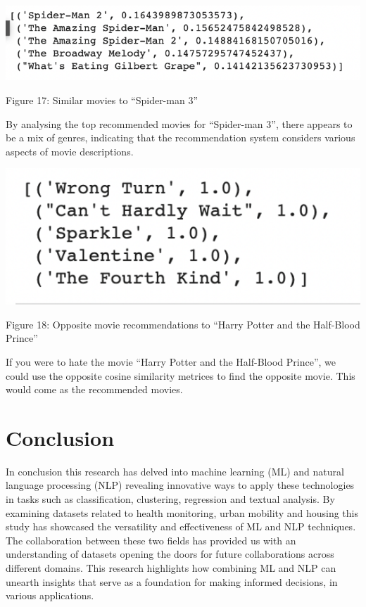 \documentclass{article}
\begin{document}
\begin{multicols}{2}
\includegraphics[scale=.5]{img/nlp5.png}

{\small
  Figure 17: Similar movies to “Spider-man 3”
  \par
  \vspace{6pt}
}

By analysing the top recommended movies for “Spider-man 3”, there appears to be a mix of genres, indicating that the recommendation system considers various aspects of movie descriptions.

\includegraphics[scale=.5]{img/nlp6.png}

{\small
  Figure 18: Opposite movie recommendations to “Harry Potter and the Half-Blood Prince”
  \par
  \vspace{6pt}
}

If you were to hate the movie “Harry Potter and the Half-Blood Prince”, we could use the opposite cosine similarity metrices to find the opposite movie. This would come as the recommended movies. 

\section{Conclusion}

In conclusion this research has delved into machine learning (ML) and natural language processing (NLP) revealing innovative ways to apply these technologies in tasks such as classification, clustering, regression and textual analysis. By examining datasets related to health monitoring, urban mobility and housing this study has showcased the versatility and effectiveness of ML and NLP techniques. The collaboration between these two fields has provided us with an understanding of datasets opening the doors for future collaborations across different domains. This research highlights how combining ML and NLP can unearth insights that serve as a foundation for making informed decisions, in various applications.

\end{multicols}
\end{document}
